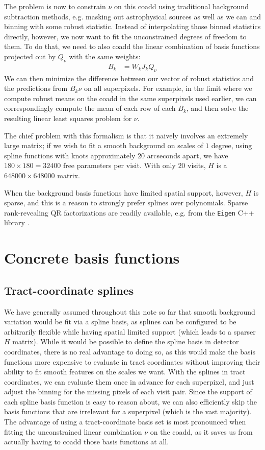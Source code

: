 \documentclass[DM,lsstdraft,authoryear,toc]{lsstdoc}
\begin{document}
The problem is now to constrain $\nu$ on this coadd using traditional background subtraction methods, e.g. masking out astrophysical sources as well as we can and binning with some robust statistic.
Instead of interpolating those binned statistics directly, however, we now want to fit the unconstrained degrees of freedom to them.
To do that, we need to also coadd the linear combination of basis functions projected out by $Q_\nu$ with the same weights:
\begin{align}
	B_k & = W_k J_k Q_\nu
\end{align}
We can then minimize the difference between our vector of robust statistics and the predictions from $B_k\nu$ on all superpixels.
For example, in the limit where we compute robust means on the coadd in the same superpixels used earlier, we can correspondingly compute the mean of each row of each $B_k$, and then solve the resulting linear least squares problem for $\nu$.

The chief problem with this formalism is that it naively involves an extremely large matrix; if we wish to fit a smooth background on scales of $1$ degree, using spline functions with knots approximately $20$ arcseconds apart, we have $180 \times 180 = 32400$ free parameters per visit.
With only $20$ visits, $H$ is a $648000 \times 648000$ matrix.

When the background basis functions have limited spatial support, however, $H$ is sparse, and this is a reason to strongly prefer splines over polynomials.
Sparse rank-revealing QR factorizations are readily available, e.g. from the \texttt{Eigen} C++ library \citep{eigenweb}.

\section{Concrete basis functions}

\subsection{Tract-coordinate splines}

We have generally assumed throughout this note so far that smooth background variation would be fit via a spline basis, as splines can be configured to be arbitrarily flexible while having spatial limited support (which leads to a sparser $H$ matrix).
While it would be possible to define the spline basis in detector coordinates, there is no real advantage to doing so, as this would make the basis functions more expensive to evaluate in tract coordinates without improving their ability to fit smooth features on the scales we want.
With the splines in tract coordinates, we can evaluate them once in advance for each superpixel, and just adjust the binning for the missing pixels of each visit pair.
Since the support of each spline basis function is easy to reason about, we can also efficiently skip the basis functions that are irrelevant for a superpixel (which is the vast majority).
The advantage of using a tract-coordinate basis set is most pronounced when fitting the unconstrained linear combination $\nu$ on the coadd, as it saves us from actually having to coadd those basis functions at all.
\end{document}
